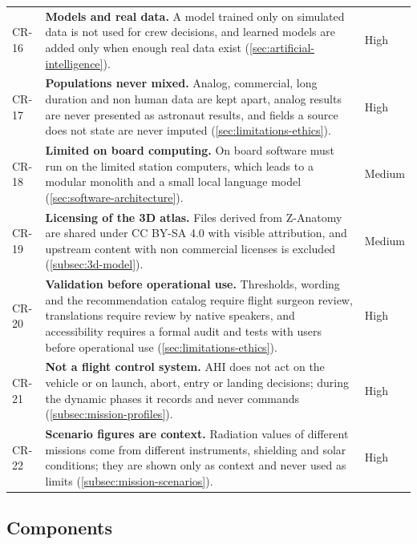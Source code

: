 {\begin{longtable}{p{1.5cm}p{10.8cm}p{1.5cm}}
CR-16 & \textbf{Models and real data.} A model trained only on simulated data is not used for crew decisions, and learned models are added only when enough real data exist (\ref{sec:artificial-intelligence}). & High \\
CR-17 & \textbf{Populations never mixed.} Analog, commercial, long duration and non human data are kept apart, analog results are never presented as astronaut results, and fields a source does not state are never imputed (\ref{sec:limitations-ethics}). & High \\
CR-18 & \textbf{Limited on board computing.} On board software must run on the limited station computers, which leads to a modular monolith and a small local language model (\ref{sec:software-architecture}). & Medium \\
CR-19 & \textbf{Licensing of the 3D atlas.} Files derived from Z-Anatomy are shared under CC BY-SA 4.0 with visible attribution, and upstream content with non commercial licenses is excluded (\ref{subsec:3d-model}). & Medium \\
CR-20 & \textbf{Validation before operational use.} Thresholds, wording and the recommendation catalog require flight surgeon review, translations require review by native speakers, and accessibility requires a formal audit and tests with users before operational use (\ref{sec:limitations-ethics}). & High \\
CR-21 & \textbf{Not a flight control system.} AHI does not act on the vehicle or on launch, abort, entry or landing decisions; during the dynamic phases it records and never commands (\ref{subsec:mission-profiles}). & High \\
CR-22 & \textbf{Scenario figures are context.} Radiation values of different missions come from different instruments, shielding and solar conditions; they are shown only as context and never used as limits (\ref{subsec:mission-scenarios}). & High \\
\end{longtable}
}

\subsection{Components}
\label{subsec:components}

